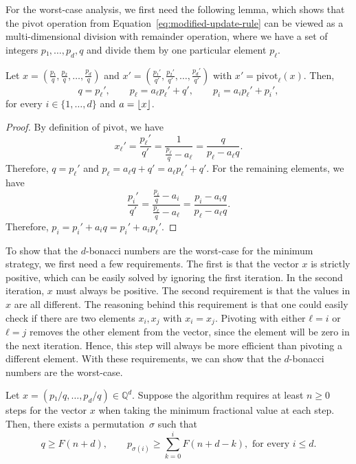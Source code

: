 For the worst-case analysis, we first need the following lemma, which shows
that the $\mathrm{pivot}$ operation from Equation~\ref{eq:modified-update-rule}
can be viewed as a multi-dimensional division with remainder operation, where
we have a set of integers $p₁, …, p_d, q$ and divide them by one particular
element $p_ℓ$.

\begin{lemma}
  \label{lem:divmod}
  Let $x = \left(\frac{p₁}{q}, \frac{p₂}{q}, …, \frac{p_d}{q}\right)$
  and $x' = \left(\frac{p₁'}{q'}, \frac{p₂'}{q'}, …, \frac{p_d'}{q'}\right)$
  with $x' = \mathrm{pivot}_ℓ(x)$.
  Then,
  \[
    q = p_ℓ',
    \qquad
    p_ℓ = a_ℓ p_ℓ' + q',
    \qquad
    p_i = a_i p_ℓ' + p_i',
  \]
  for every $i ∈ \{1, …, d\}$ and $a = \left\lfloor x\right\rfloor$.
\end{lemma}

\begin{proof}
  By definition of $\mathrm{pivot}$, we have
  \[
    x_ℓ' = \frac{p_ℓ'}{q'} = \frac{1}{\frac{p_ℓ}{q} - a_ℓ} = \frac{q}{p_ℓ - a_ℓ q}.
  \]
  Therefore, $q = p_ℓ'$ and $p_ℓ = a_ℓ q + q' = a_ℓ p_ℓ' + q'$.
  For the remaining elements, we have
  \[
    \frac{p_i'}{q'} = \frac{\frac{p_i}{q} - a_i}{\frac{p_ℓ}{q} - a_ℓ} = \frac{p_i - a_i q}{p_ℓ - a_ℓ q}.
  \]
  Therefore, $p_i = p_i' + a_i q = p_i' + a_i p_ℓ'$.
\end{proof}

To show that the $d$-bonacci numbers are the worst-case for the minimum
strategy, we first need a few requirements.
The first is that the vector $x$ is strictly positive,
which can be easily solved by ignoring the first iteration.
In the second iteration, $x$ must always be positive.
The second requirement is that the values in $x$ are all different.
The reasoning behind this requirement is that one could easily check if there
are two elements $x_i, x_j$ with $x_i = x_j$.
Pivoting with either $ℓ = i$ or $ℓ = j$ removes the other element from the
vector, since the element will be zero in the next iteration.
Hence, this step will always be more efficient than pivoting a different element.
With these requirements, we can show that the $d$-bonacci numbers are the worst-case.

\begin{theorem}
  Let $x = (p₁/q, …, p_d/q) ∈ ℚ^d$.
  Suppose the algorithm requires at least $n ≥ 0$ steps for the vector $x$ when
  taking the minimum fractional value at each step.
  Then, there exists a permutation~$σ$ such that
  \[
    q ≥ F(n+d),
    \qquad
    p_{σ(i)} ≥ \sum_{k = 0}^i F(n+d - k),
    \text{ for every } i ≤ d.
  \]
\end{theorem}

